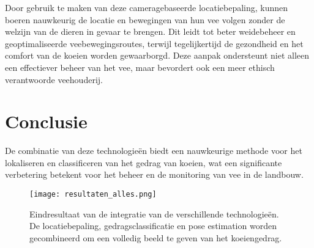 Door gebruik te maken van deze cameragebaseerde locatiebepaling, kunnen boeren nauwkeurig de locatie en bewegingen van hun vee volgen zonder de welzijn van de dieren in gevaar te brengen. Dit leidt tot beter weidebeheer en geoptimaliseerde veebewegingsroutes, terwijl tegelijkertijd de gezondheid en het comfort van de koeien worden gewaarborgd. Deze aanpak ondersteunt niet alleen een effectiever beheer van het vee, maar bevordert ook een meer ethisch verantwoorde veehouderij.
\section{Conclusie}
De combinatie van deze technologieën biedt een nauwkeurige methode voor het lokaliseren en classificeren van het gedrag van koeien, wat een significante verbetering betekent voor het beheer en de monitoring van vee in de landbouw.
\newline
\begin{figure}[H]
  \centering
  \texttt{[image: resultaten\_alles.png]}
  \caption{Eindresultaat van de integratie van de verschillende technologieën. De locatiebepaling, gedragsclassificatie en pose estimation worden gecombineerd om een volledig beeld te geven van het koeiengedrag.}
  \label{fig:resultaten_alles}  
\end{figure}
\newline
